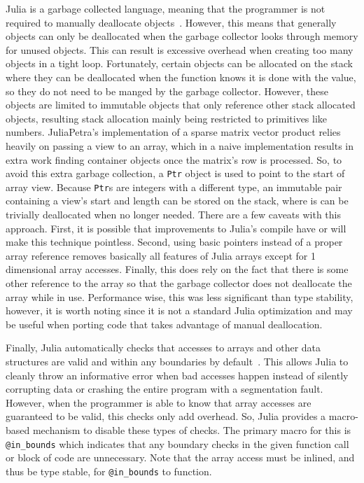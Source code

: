 \documentclass[acmsmall]{acmart}
\newcommand{\snippet}[1]{\lstinline{#1}}
\begin{document}
	Julia is a garbage collected language, meaning that the programmer is not required to manually deallocate objects~\cite{Bezanson:2017:FreshApproach}.
	However, this means that generally objects can only be deallocated when the garbage collector looks through memory for unused objects.
	This can result is excessive overhead when creating too many objects in a tight loop.
	Fortunately, certain objects can be allocated on the stack where they can be deallocated when the function knows it is done with the value, so they do not need to be manged by the garbage collector.
	However, these objects are limited to immutable objects that only reference other stack allocated objects, resulting stack allocation mainly being restricted to primitives like numbers.
	JuliaPetra's implementation of a sparse matrix vector product relies heavily on passing a view to an array, which in a naive implementation results in extra work finding container objects once the matrix's row is processed.
	So, to avoid this extra garbage collection, a \snippet{Ptr} object is used to point to the start of array view.
	Because \snippet{Ptr}s are integers with a different type, an immutable pair containing a view's start and length can be stored on the stack, where is can be trivially deallocated when no longer needed.
	There are a few caveats with this approach.
	First, it is possible that improvements to Julia's compile have or will make this technique pointless.
	Second, using basic pointers instead of a proper array reference removes basically all features of Julia arrays except for 1 dimensional array accesses.
	Finally, this does rely on the fact that there is some other reference to the array so that the garbage collector does not deallocate the array while in use.
	Performance wise, this was less significant than type stability, however, it is worth noting since it is not a standard Julia optimization and may be useful when porting code that takes advantage of manual deallocation.
	
	Finally, Julia automatically checks that accesses to arrays and other data structures are valid and within any boundaries by default~\cite{Bezanson:2017:FreshApproach}.
	This allows Julia to cleanly throw an informative error when bad accesses happen instead of silently corrupting data or crashing the entire program with a segmentation fault.
	However, when the programmer is able to know that array accesses are guaranteed to be valid, this checks only add overhead.
	So, Julia provides a macro-based mechanism to disable these types of checks.
	The primary macro for this is \snippet{@in_bounds} which indicates that any boundary checks in the given function call or block of code are unnecessary.
	Note that the array access must be inlined, and thus be type stable, for \snippet{@in_bounds} to function.
	
\end{document}
